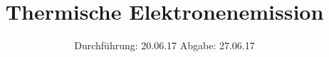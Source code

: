 

\subject{V504}
\title{Thermische Elektronenemission}
\date{
  Durchführung: 20.06.17
  \hspace{3em}
  Abgabe: 27.06.17
}



\maketitle
\thispagestyle{empty}
\tableofcontents
\newpage
\setcounter{page}{1}





\printbibliography


